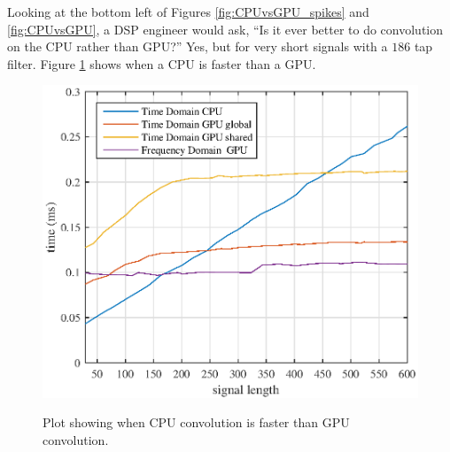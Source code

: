 Looking at the bottom left of Figures \ref{fig:CPUvsGPU_spikes} and \ref{fig:CPUvsGPU}, a DSP engineer would ask, ``Is it ever better to do convolution on the CPU rather than GPU?''
Yes, but for very short signals with a $186$ tap filter.
Figure \ref{fig:CPUvsGPU_CPUtoGPU} shows when a CPU is faster than a GPU.
\begin{figure}
	\caption{Plot showing when CPU convolution is faster than GPU convolution.}
	\centering\includegraphics[width=5in]{figures/gpu_intro/CPUvsGPU_CPUtoGPU.eps}
	\label{fig:CPUvsGPU_CPUtoGPU}
\end{figure}

